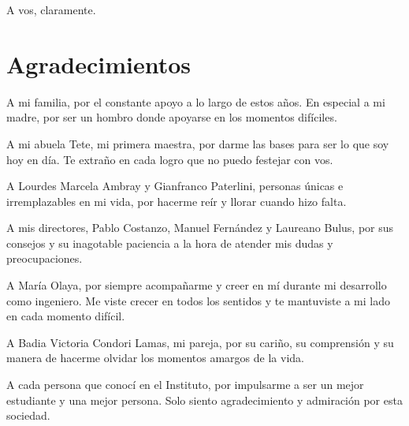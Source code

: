 \thispagestyle{empty}
\vspace*{0.35\textheight}
\begin{flushright}
{A vos, claramente.}
\end{flushright}
\cleardoublepage



\chapter*{Agradecimientos}


\vspace{2em}

{\leftskip=1.5cm
 \setlength{\parskip}{1.2em plus 0.3em}

A mi familia, por el constante apoyo a lo largo de estos a\~nos. En especial a mi madre, por ser un hombro donde apoyarse en los momentos dif\'iciles.

A mi abuela Tete, mi primera maestra, por darme las bases para ser lo que soy hoy en d\'ia. Te extra\~no en cada logro que no puedo festejar con vos.

A Lourdes Marcela Ambray y Gianfranco Paterlini, personas \'unicas e irremplazables en mi vida, por hacerme re\'ir y llorar cuando hizo falta.

A mis directores, Pablo Costanzo, Manuel Fern\'andez y Laureano Bulus, por sus consejos y su inagotable paciencia a la hora de atender mis dudas y preocupaciones.

A Mar\'ia Olaya, por siempre acompa\~narme y creer en m\'i durante mi desarrollo como ingeniero. Me viste crecer en todos los sentidos y te mantuviste a mi lado en cada momento dif\'icil. 

A Badia Victoria Condori Lamas, mi pareja, por su cari\~no, su comprensi\'on y su manera de hacerme olvidar los momentos amargos de la vida.

A cada persona que conoc\'i en el Instituto, por impulsarme a ser un mejor estudiante y una mejor persona. Solo siento agradecimiento y admiraci\'on por esta sociedad.

\par}



\cleardoublepage
